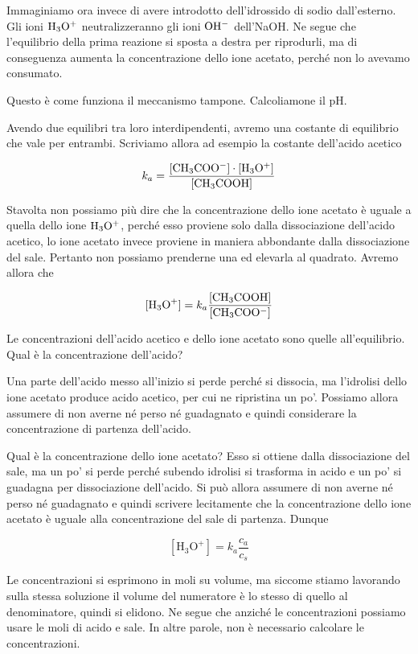 Immaginiamo ora invece di avere introdotto dell'idrossido di sodio dall'esterno. Gli ioni $\rm H_3O^+$ neutralizzeranno gli ioni $\rm OH^-$ dell'NaOH. Ne segue che l'equilibrio della prima reazione si sposta a destra per riprodurli, ma di conseguenza aumenta la concentrazione dello ione acetato, perché non lo avevamo consumato.

Questo è come funziona il meccanismo tampone. Calcoliamone il pH.

Avendo due equilibri tra loro interdipendenti, avremo una costante di equilibrio che vale per entrambi. Scriviamo allora ad esempio la costante dell'acido acetico

$$k_a = \rm{\frac{[CH_3COO^-] \cdot [H_3O^+]}{[CH_3COOH]}}$$

Stavolta non possiamo più dire che la concentrazione dello ione acetato è uguale a quella dello ione $\rm H_3O^+$, perché esso proviene solo dalla dissociazione dell'acido acetico, lo ione acetato invece proviene in maniera abbondante dalla dissociazione del sale. Pertanto non possiamo prenderne una ed elevarla al quadrato. Avremo allora che

$$[\text{H}_3\text{O}^+] = k_a \rm{\frac{[CH_3COOH]}{[CH_3COO^-]}}$$

Le concentrazioni dell'acido acetico e dello ione acetato sono quelle all'equilibrio. Qual è la concentrazione dell'acido?

Una parte dell'acido messo all'inizio si perde perché si dissocia, ma l'idrolisi dello ione acetato produce acido acetico, per cui ne ripristina un po'. Possiamo allora assumere di non averne né perso né guadagnato e quindi considerare la concentrazione di partenza dell'acido.

Qual è la concentrazione dello ione acetato? Esso si ottiene dalla dissociazione del sale, ma un po' si perde perché subendo idrolisi si trasforma in acido e un po' si guadagna per dissociazione dell'acido. Si può allora assumere di non averne né perso né guadagnato e quindi scrivere lecitamente che la concentrazione dello ione acetato è uguale alla concentrazione del sale di partenza. Dunque

$$[\text{H}_3\text{O}^+] = k_a \frac{c_a}{c_s}$$

Le concentrazioni si esprimono in moli su volume, ma siccome stiamo lavorando sulla stessa soluzione il volume del numeratore è lo stesso di quello al denominatore, quindi si elidono. Ne segue che anziché le concentrazioni possiamo usare le moli di acido e sale. In altre parole, non è necessario calcolare le concentrazioni.


